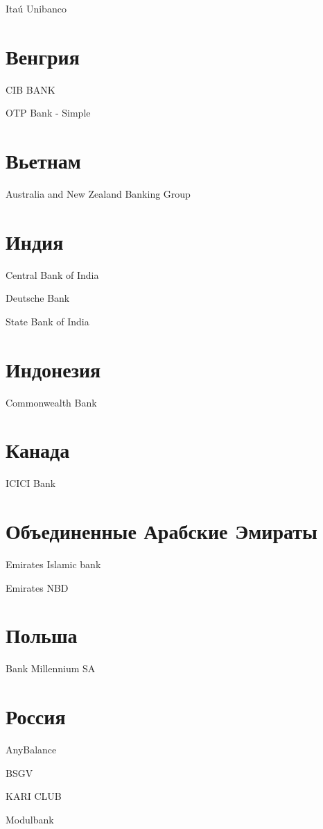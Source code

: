 \documentclass[a4paper,10pt,russian]{sphinxmanual}
\begin{document}
Itaú Unibanco


\section{Венгрия}
\label{\detokenize{banks:id4}}
CIB BANK

OTP Bank - Simple


\section{Вьетнам}
\label{\detokenize{banks:id5}}
Australia and New Zealand Banking Group


\section{Индия}
\label{\detokenize{banks:id6}}
Central Bank of India

Deutsche Bank

State Bank of India


\section{Индонезия}
\label{\detokenize{banks:id7}}
Commonwealth Bank


\section{Канада}
\label{\detokenize{banks:id8}}
ICICI Bank


\section{Объединенные Арабские Эмираты}
\label{\detokenize{banks:id9}}
Emirates Islamic bank

Emirates NBD


\section{Польша}
\label{\detokenize{banks:id10}}
Bank Millennium SA


\section{Россия}
\label{\detokenize{banks:id11}}
AnyBalance

BSGV

KARI CLUB

Modulbank
\end{document}

